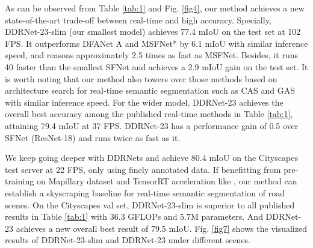 \documentclass[journal]{IEEEtran}
\begin{document}
As can be observed from Table \ref{tab:1} and Fig. \ref{fig4}, our method achieves a new state-of-the-art trade-off between real-time and high accuracy. Specially, DDRNet-23-slim (our smallest model) achieves 77.4 mIoU on the test set at 102 FPS. It outperforms DFANet A and MSFNet* by 6.1 mIoU with similar inference speed, and reasons approximately 2.5 times as fast as MSFNet. Besides, it runs 40 faster than the smallest SFNet and achieves a 2.9 mIoU gain on the test set. It is worth noting that our method also towers over those methods based on architecture search for real-time semantic segmentation such as CAS\cite{zhang2019customizable} and GAS\cite{lin2020graph} with similar inference speed. For the wider model, DDRNet-23 achieves the overall best accuracy among the published real-time methods in Table \ref{tab:1}, attaining 79.4 mIoU at 37 FPS. DDRNet-23 has a performance gain of 0.5 over SFNet (ResNet-18) and runs twice as fast as it.


We keep going deeper with DDRNets and achieve 80.4 mIoU on the Cityscapes test server at 22 FPS, only using finely annotated data. If benefitting from pre-training on Mapillary\cite{neuhold2017mapillary} dataset and TensorRT acceleration like \cite{li2020semantic}, our method can establish a skyscraping baseline for real-time semantic segmentation of road scenes. On the Cityscapes val set, DDRNet-23-slim is superior to all published results in Table \ref{tab:1} with 36.3 GFLOPs and 5.7M parameters. And DDRNet-23 achieves a new overall best result of 79.5 mIoU. Fig. \ref{fig7} shows the visualized results of DDRNet-23-slim and DDRNet-23 under different scenes.
\end{document}
